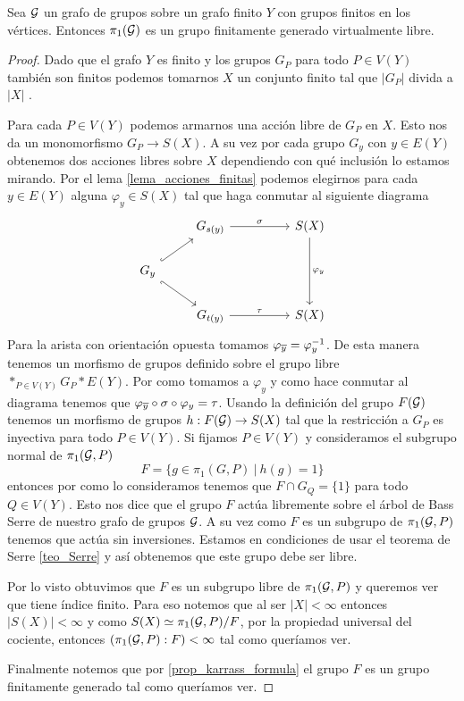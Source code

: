 \documentclass[tesis.tex]{subfiles}
\newcommand{\fg}{grupo finitamente generado }
\newcommand{\cG}{ {\cal G} }
\begin{document}
\begin{teo}\cite{karrass1973finite}
	Sea $\cal G$ un grafo de grupos sobre un grafo finito $Y$ con grupos finitos en los vértices.
	Entonces $\pi_1(\cal G)$ es un \fg virtualmente libre.
\end{teo}
\begin{proof}
	Dado que el grafo $Y$ es finito y los grupos $G_P$ para todo $P \in V(Y)$ también son finitos podemos tomarnos $X$ un conjunto finito tal que $|G_P| $ divida a $|X|$ .
	
	Para cada $P \in V(Y)$ podemos armarnos una acción libre de $G_P$ en $X$. 
	Esto nos da un monomorfismo $G_P \to S(X)$.
	A su vez por cada grupo $G_y$ con $y \in E(Y)$ obtenemos dos acciones libres sobre $X$ dependiendo con qué inclusión lo estamos mirando.
	Por el lema \ref{lema_acciones_finitas} podemos elegirnos para cada $y \in E(Y)$ alguna $\varphi_y \in S(X)$ tal que haga conmutar al siguiente diagrama
	\[\begin{tikzcd}
		& {G_{s(y)}} && {S(X)} \\
		{G_y} \\
		& {G_{t(y)}} && {S(X)}
		\arrow["\sigma", from=1-2, to=1-4]
		\arrow["\tau", from=3-2, to=3-4]
		\arrow[hook, from=2-1, to=1-2]
		\arrow[hook', from=2-1, to=3-2]
		\arrow["\varphi_y", from=1-4, to=3-4]
	\end{tikzcd}\]
	Para la arista con orientación opuesta tomamos $\varphi_{\overline y} = \varphi_y^{-1}$.
	De esta manera tenemos un morfismo de grupos definido sobre el grupo libre $\ast_{P \in V(Y)} G_P \ast E(Y)$.
	Por como tomamos a $\varphi_y$ y como hace conmutar al diagrama tenemos que $\varphi_{\overline y} \circ \sigma \circ \varphi_y = \tau$.	
	Usando la definición del grupo $F(\cG)$ tenemos un morfismo de grupos $h: F(\cG) \to S(X)$ tal que la restricción a $G_P$ es inyectiva para todo $P \in V(Y)$.
	Si fijamos $P \in V(Y)$ y consideramos el subgrupo normal de $\pi_1(\cG, P)$ 
	\[
	F = \{  g \in \pi_1(G,P) \ | \ h(g) = 1  \}
	\]
	entonces por como lo consideramos tenemos que $F \cap G_Q = \{ 1 \}$ para todo $Q \in V(Y)$.
	Esto nos dice que el grupo $F$ actúa libremente sobre el árbol de Bass Serre de nuestro grafo de grupos $\cG$.
	A su vez como $F$ es un subgrupo de $\pi_1 (\cG, P)$ tenemos que actúa sin inversiones.
	Estamos en condiciones de usar el teorema de Serre \ref{teo_Serre} y así obtenemos que este grupo debe ser libre. 
	
	Por lo visto obtuvimos que $F$ es un subgrupo libre de $\pi_1(\cG, P)$ y queremos ver que tiene índice finito.
	Para eso notemos que al ser $|X| < \infty$ entonces $|S(X)| < \infty$ y como $S(X) \simeq \pi_1(\cG, P) / F$, por la propiedad universal del cociente, entonces $(\pi_1(\cG, P) : F) < \infty$ tal como queríamos ver.
	
	Finalmente notemos que por \ref{prop_karrass_formula} el grupo $F$ es un \fg tal como queríamos ver.
\end{proof}
\end{document}
